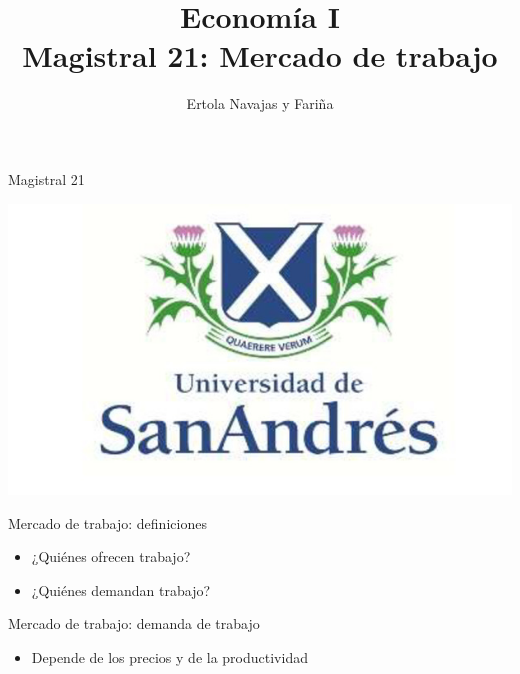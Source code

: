 \documentclass{beamer}
\title[Economía I]{Economía I \vspace{4mm}
\\ Magistral 21: Mercado de trabajo}
\date{}
\author[Ertola Navajas y Fariña]{Ertola Navajas y Fariña}
\institute[]{Universidad de San Andrés}
\begin{document}
\begin{frame}
\titlepage
\centering
Magistral 21

\includegraphics[scale=0.2]{Slides Principios de Economia/Figures/logoUDESA.jpg} 
\end{frame}


\begin{frame}{Mercado de trabajo: definiciones}
\begin{itemize}
    \item ¿Quiénes ofrecen trabajo?
    \vspace{2mm}
    \item ¿Quiénes demandan trabajo?
\end{itemize} 
\end{frame}


\begin{frame}{Mercado de trabajo: demanda de trabajo}
\begin{itemize}
\item Depende de los precios y de la productividad 
\end{itemize}
\begin{center}
\begin{figure}[H]
\renewcommand{\figurename}{Figure}
\begin{center}
\end{center}
\end{figure}
\end{center} 
\end{frame}
\end{document}
